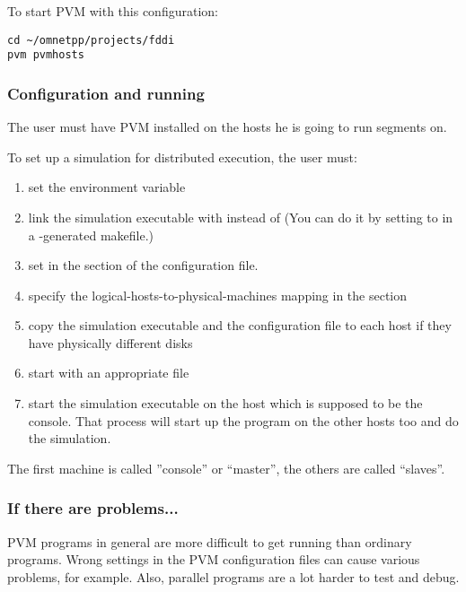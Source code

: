 To start PVM with this configuration:

\begin{Verbatim}
cd ~/omnetpp/projects/fddi
pvm pvmhosts
\end{Verbatim}

\subsubsection{Configuration and running}

The user must have PVM installed on the hosts he is going to 
run segments on.


To set up a simulation for distributed execution, the user must:
\begin{enumerate}
\item{set the  environment variable}
\item{link the simulation executable with  instead of
   (You can do it by setting  to
   in a -generated makefile.)}
\item{set  in the \ttt{[General]} section of the
  configuration file.}
\item{specify the logical-hosts-to-physical-machines mapping in the
  \ttt{[Machines]} section}
\item{copy the simulation executable and the configuration file to
  each host if they have physically different disks}
\item{start  with an appropriate  file}
\item{start the simulation executable on the host which is supposed to
  be the console. That process will start up the program on the other
  hosts too and do the simulation.}
\end{enumerate}

The first machine is called ''console'' or ``master'', the 
others are called ``slaves''.


\subsubsection{If there are problems...}


PVM programs in general are more difficult to get running than 
ordinary programs. Wrong settings in the PVM configuration files 
can cause various problems, for example. Also, parallel programs 
are a lot harder to test and debug.


